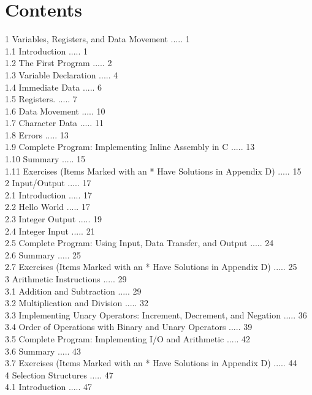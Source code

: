 \documentclass[10pt]{article}
\begin{document}
\section*{Contents}
1 Variables, Registers, and Data Movement ..... 1\\
1.1 Introduction ..... 1\\
1.2 The First Program ..... 2\\
1.3 Variable Declaration ..... 4\\
1.4 Immediate Data ..... 6\\
1.5 Registers. ..... 7\\
1.6 Data Movement ..... 10\\
1.7 Character Data ..... 11\\
1.8 Errors ..... 13\\
1.9 Complete Program: Implementing Inline Assembly in C ..... 13\\
1.10 Summary ..... 15\\
1.11 Exercises (Items Marked with an * Have Solutions in Appendix D) ..... 15\\
2 Input/Output ..... 17\\
2.1 Introduction ..... 17\\
2.2 Hello World ..... 17\\
2.3 Integer Output ..... 19\\
2.4 Integer Input ..... 21\\
2.5 Complete Program: Using Input, Data Transfer, and Output ..... 24\\
2.6 Summary ..... 25\\
2.7 Exercises (Items Marked with an * Have Solutions in Appendix D) ..... 25\\
3 Arithmetic Instructions ..... 29\\
3.1 Addition and Subtraction ..... 29\\
3.2 Multiplication and Division ..... 32\\
3.3 Implementing Unary Operators: Increment, Decrement, and Negation ..... 36\\
3.4 Order of Operations with Binary and Unary Operators ..... 39\\
3.5 Complete Program: Implementing I/O and Arithmetic ..... 42\\
3.6 Summary ..... 43\\
3.7 Exercises (Items Marked with an * Have Solutions in Appendix D) ..... 44\\
4 Selection Structures ..... 47\\
4.1 Introduction ..... 47\\
\end{document}
